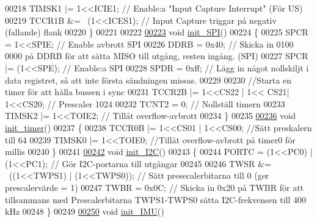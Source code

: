 \begin{DoxyCode}
00218     TIMSK1 |= 1<<ICIE1;                 \textcolor{comment}{// Enable:a "Input Capture Interrupt" (För US)}
00219     TCCR1B &= ~(1<<ICES1);              \textcolor{comment}{// Input Capture triggar på negativ (fallande) flank}
00220 \}
00221 
00222 
\hypertarget{sensor_8c_source.tex_l00223}{}\hyperlink{sensor_8h_a1065be4c03eff55f82e136ccb95a2854}{00223} \textcolor{keywordtype}{void} \hyperlink{sensor_8c_a1065be4c03eff55f82e136ccb95a2854}{init\_SPI}()
00224 \{
00225     SPCR = 1<<SPIE;                         \textcolor{comment}{// Enable avbrott SPI}
00226     DDRB = 0x40;                            \textcolor{comment}{// Skicka in 0100 0000 på DDRB för att sätta MISO till utgång,
       resten ingång. (SPI)}
00227     SPCR |= (1<<SPE);                       \textcolor{comment}{// Enable:a SPI}
00228     SPDR = 0xff;                            \textcolor{comment}{// Lägg in något nollskiljt i data registret, så att inte
       första sändningen missas.}
00229 
00230     \textcolor{comment}{//Starta en timer för att hålla bussen i sync}
00231     TCCR2B |= 1<<CS22 | 1<< CS21| 1<<CS20;  \textcolor{comment}{// Prescaler 1024}
00232     TCNT2 = 0;                              \textcolor{comment}{// Nollställ timern}
00233     TIMSK2 |= 1<<TOIE2;                     \textcolor{comment}{// Tillåt overflow-avbrott}
00234 \}
00235 
\hypertarget{sensor_8c_source.tex_l00236}{}\hyperlink{sensor_8h_a38016ab7b2931bcb950e0c6f3ba3f342}{00236} \textcolor{keywordtype}{void} \hyperlink{sensor_8c_a38016ab7b2931bcb950e0c6f3ba3f342}{init\_timer}()
00237 \{
00238     TCCR0B |= 1<<CS01 | 1<<CS00;        \textcolor{comment}{//Sätt preskalern till 64}
00239     TIMSK0 |= 1<<TOIE0;                 \textcolor{comment}{//Tillåt overflow-avbrott på timer0 för millis}
00240 \}
00241 
\hypertarget{sensor_8c_source.tex_l00242}{}\hyperlink{sensor_8h_a87c8819d26491fb701918e147117710c}{00242} \textcolor{keywordtype}{void} \hyperlink{sensor_8c_a87c8819d26491fb701918e147117710c}{init\_I2C}()
00243 \{
00244     PORTC = (1<<PC0) | (1<<PC1);        \textcolor{comment}{// Gör I2C-portarna till utgångar}
00245 
00246     TWSR &= ~((1<<TWPS1) | (1<<TWPS0)); \textcolor{comment}{// Sätt presecalerbitarna till 0 (ger prescalervärde = 1)}
00247     TWBR = 0x0C;                        \textcolor{comment}{// Skicka in 0x20 på TWBR för att tillsammans med Prescalerbitarna
       TWPS1-TWPS0 sätta I2C-frekvensen till 400 kHz}
00248 \}
00249 
\hypertarget{sensor_8c_source.tex_l00250}{}\hyperlink{sensor_8h_a1009b8de0745458d734bd73beda5ea25}{00250} \textcolor{keywordtype}{void} \hyperlink{sensor_8c_a1009b8de0745458d734bd73beda5ea25}{init\_IMU}()

\end{DoxyCode}
